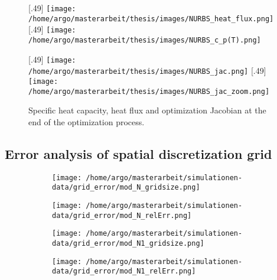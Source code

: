 \documentclass{scrartcl}[12pt, halfparskip]
\begin{document}
\begin{figure}[H]
	[.49\linewidth]
	{\texttt{[image: /home/argo/masterarbeit/thesis/images/NURBS\_heat\_flux.png]}}
	[.49\linewidth]
	{\texttt{[image: /home/argo/masterarbeit/thesis/images/NURBS\_c\_p(T).png]}}

	[.49\linewidth]
	{\texttt{[image: /home/argo/masterarbeit/thesis/images/NURBS\_jac.png]}}
	\hspace{0.5cm}
	[.49\linewidth]
	{\texttt{[image: /home/argo/masterarbeit/thesis/images/NURBS\_jac\_zoom.png]}}
	\caption{Specific heat capacity, heat flux and optimization Jacobian at the end of the optimization process.}
	\label{fig:NURBS_results}
\end{figure}




\subsection{Error analysis of spatial discretization grid}

\begin{figure}[H]
	\begin{subfigure}{0.49\textwidth}
		\texttt{[image: /home/argo/masterarbeit/simulationen-data/grid\_error/mod\_N\_gridsize.png]}
		\caption{}
		\label{fig:gridsize_mod_N}
	\end{subfigure}
	\begin{subfigure}{0.49\textwidth}
		\texttt{[image: /home/argo/masterarbeit/simulationen-data/grid\_error/mod\_N\_relErr.png]}
		\caption{}
		\label{fig:grid_relErr_mod_N}
	\end{subfigure}
\end{figure}


\begin{figure}[H]
	\begin{subfigure}{0.49\textwidth}
		\texttt{[image: /home/argo/masterarbeit/simulationen-data/grid\_error/mod\_N1\_gridsize.png]}
		\caption{}
		\label{fig:gridsize_mod_N1}
	\end{subfigure}
	\begin{subfigure}{0.49\textwidth}
		\texttt{[image: /home/argo/masterarbeit/simulationen-data/grid\_error/mod\_N1\_relErr.png]}
		\caption{}
		\label{fig:grid_relErr_mod_N1}
	\end{subfigure}
\end{figure}
\end{document}
